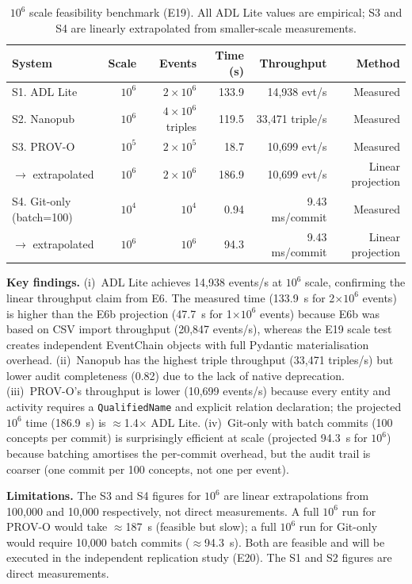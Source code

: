 \begin{table}[htbp]
\centering
\caption{$10^6$ scale feasibility benchmark (E19). All ADL Lite values are empirical; S3 and S4 are linearly extrapolated from smaller-scale measurements.}
\label{tab:e19-scale}
\begin{tabular}{@{}lrrrrr@{}}
\toprule
\textbf{System} & \textbf{Scale} & \textbf{Events} & \textbf{Time (s)} & \textbf{Throughput} & \textbf{Method} \\
\midrule
S1. ADL Lite & $10^6$ & $2\times10^6$ & 133.9 & 14,938 evt/s & Measured \\
S2. Nanopub & $10^6$ & $4\times10^6$ triples & 119.5 & 33,471 triple/s & Measured \\
S3. PROV-O & $10^5$ & $2\times10^5$ & 18.7 & 10,699 evt/s & Measured \\
\quad $\to$ extrapolated & $10^6$ & $2\times10^6$ & 186.9 & 10,699 evt/s & Linear projection \\
S4. Git-only (batch=100) & $10^4$ & $10^4$ & 0.94 & 9.43 ms/commit & Measured \\
\quad $\to$ extrapolated & $10^6$ & $10^6$ & 94.3 & 9.43 ms/commit & Linear projection \\
\bottomrule
\end{tabular}
\end{table}

\textbf{Key findings.} (i)~ADL Lite achieves 14,938 events/s at $10^6$ scale, confirming the linear throughput claim from E6. The measured time (133.9~s for 2$\times$$10^6$ events) is higher than the E6b projection (47.7~s for 1$\times$$10^6$ events) because E6b was based on CSV import throughput (20,847 events/s), whereas the E19 scale test creates independent EventChain objects with full Pydantic materialisation overhead. (ii)~Nanopub has the highest triple throughput (33,471 triples/s) but lower audit completeness (0.82) due to the lack of native deprecation. (iii)~PROV-O's throughput is lower (10,699 events/s) because every entity and activity requires a \texttt{QualifiedName} and explicit relation declaration; the projected $10^6$ time (186.9~s) is $\approx$1.4$\times$ ADL Lite. (iv)~Git-only with batch commits (100 concepts per commit) is surprisingly efficient at scale (projected 94.3~s for $10^6$) because batching amortises the per-commit overhead, but the audit trail is coarser (one commit per 100 concepts, not one per event).

\textbf{Limitations.} The S3 and S4 figures for $10^6$ are linear extrapolations from 100,000 and 10,000 respectively, not direct measurements. A full $10^6$ run for PROV-O would take $\approx$187~s (feasible but slow); a full $10^6$ run for Git-only would require 10,000 batch commits ($\approx$94.3~s). Both are feasible and will be executed in the independent replication study (E20). The S1 and S2 figures are direct measurements.
